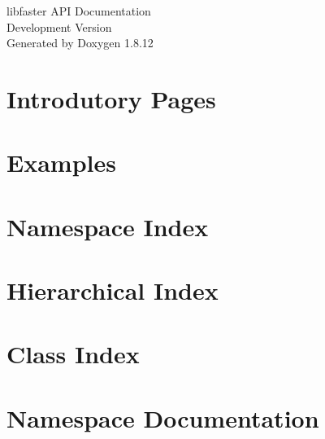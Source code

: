 \documentclass[twoside]{book}
\newcommand{\+}{\discretionary{\mbox{\scriptsize$\hookleftarrow$}}{}{}}
\newcommand{\clearemptydoublepage}{%
  \newpage{\pagestyle{empty}\cleardoublepage}%
}
\begin{document}
\hypersetup{pageanchor=false,
             bookmarksnumbered=true,
             pdfencoding=unicode
            }
\begin{titlepage}
\vspace*{7cm}
\begin{center}%
{\Large libfaster A\+PI Documentation \\[1ex]\large Development Version }\\
\vspace*{1cm}
{\large Generated by Doxygen 1.8.12}\\
\end{center}
\end{titlepage}
\clearemptydoublepage
{}
\tableofcontents
\clearemptydoublepage
{}
\hypersetup{pageanchor=true}

\chapter{Introdutory Pages}
\label{index}\hypertarget{index}{}
\chapter{Examples}
\label{examples}
\hypertarget{examples}{}

\chapter{Namespace Index}

\chapter{Hierarchical Index}

\chapter{Class Index}

\chapter{Namespace Documentation}

\end{document}
